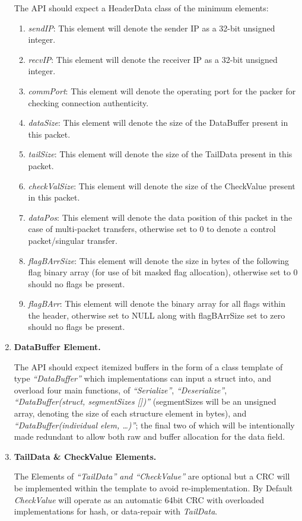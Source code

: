 \documentclass{article}
\begin{document}
\begin{enumerate}
    The API should expect a HeaderData class of the minimum elements:
    \begin{enumerate}
        \item \textit{sendIP}: This element will denote the sender IP as a 32-bit unsigned integer.
        \item \textit{recvIP}: This element will denote the receiver IP as a 32-bit unsigned integer.
        \item \textit{commPort}: This element will denote the operating port for the packer for checking connection authenticity.
        \item \textit{dataSize}: This element will denote the size of the DataBuffer present in this packet.
        \item \textit{tailSize}: This element will denote the size of the TailData present in this packet.
        \item \textit{checkValSize}: This element will denote the size of the CheckValue present in this packet.
        \item \textit{dataPos}: This element will denote the data position of this packet in the case of multi-packet transfers, otherwise set to 0 to denote a control packet/singular transfer.
        \item \textit{flagBArrSize}: This element will denote the size in bytes of the following flag binary array (for use of bit masked flag allocation), otherwise set to 0 should no flags be present.
        \item \textit{flagBArr}: This element will denote the binary array for all flags within the header, otherwise set to NULL along with flagBArrSize set to zero should no flags be present.
    \end{enumerate}

    \item \textbf{DataBuffer Element.}
    
    The API should expect itemized buffers in the form of a class template of type \textit{``DataBuffer''} which implementations can input a struct into, and overload four main functions, of \textit{``Serialize''}, \textit{``Deserialize''}, \textit{``DataBuffer(struct, segmentSizes [])''} (segmentSizes will be an unsigned array, denoting the size of each structure element in bytes), and \textit{``DataBuffer(individual elem, \dots)''}; the final two of which will be intentionally made redundant to allow both raw and buffer allocation for the data field.
    
    \item \textbf{TailData \& CheckValue Elements.}
    
    The Elements of \textit{``TailData'' and ``CheckValue''} are optional but a CRC will be implemented within the template to avoid re-implementation. By Default \textit{CheckValue} will operate as an automatic 64bit CRC with overloaded implementations  for hash, or data-repair with \textit{TailData}.
    
\end{enumerate}
\end{document}
